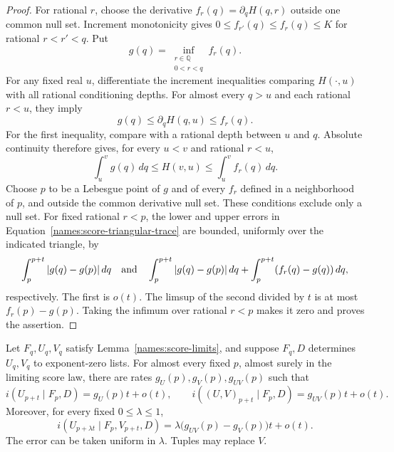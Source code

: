 \begin{proof}
For rational $r$, choose the derivative
$f_r(q)=\partial_qH(q,r)$ outside one common null set.  Increment
monotonicity gives $0\le f_{r'}(q)\le f_r(q)\le K$ for rational
$r<r'<q$.  Put
\[
 g(q)=\inf_{\substack{r\in\mathbb Q\\0<r<q}}f_r(q).
\]
For any fixed real $u$, differentiate the increment inequalities
comparing $H(\cdot,u)$ with all rational conditioning depths.  For
almost every $q>u$ and each rational $r<u$, they imply
\[
 g(q)\le\partial_qH(q,u)\le f_r(q).
\]
For the first inequality, compare with a rational depth between $u$
and $q$.  Absolute continuity therefore gives, for every $u<v$ and
rational $r<u$,
\begin{equation}
 \int_u^v g(q)\,dq\le H(v,u)\le\int_u^v f_r(q)\,dq.
 \label{names:score-trace-sandwich}
\end{equation}
Choose $p$ to be a Lebesgue point of $g$ and of every $f_r$ defined in a
neighborhood of $p$, and outside the common derivative null set.  These
conditions exclude only a null set.  For fixed rational $r<p$, the lower
and upper errors in Equation~\eqref{names:score-triangular-trace} are
bounded, uniformly over the indicated triangle, by
\[
 \int_p^{p+t}|g(q)-g(p)|\,dq
 \quad\hbox{and}\quad
 \int_p^{p+t}|g(q)-g(p)|\,dq
       +\int_p^{p+t}(f_r(q)-g(q))\,dq,
\]
respectively.  The first is $o(t)$.  The limsup of the second divided by
$t$ is at most $f_r(p)-g(p)$.  Taking the infimum over rational $r<p$
makes it zero and proves the assertion.
\end{proof}

\begin{corollary}
\label{names:score-future-prefix}
Let $F_q,U_q,V_q$ satisfy Lemma~\ref{names:score-limits}, and suppose
$F_q,D$ determines $U_q,V_q$ to exponent-zero lists.  For almost every
fixed $p$, almost surely in the limiting score law, there are rates
$g_U(p),g_V(p),g_{UV}(p)$ such that
\[
 i(U_{p+t}\mid F_p,D)=g_U(p)t+o(t),\qquad
 i((U,V)_{p+t}\mid F_p,D)=g_{UV}(p)t+o(t).
\]
Moreover, for every fixed $0\le\lambda\le1$,
\begin{equation}
 i(U_{p+\lambda t}\mid F_p,V_{p+t},D)
  =\lambda\bigl(g_{UV}(p)-g_V(p)\bigr)t+o(t).
 \label{names:score-future-prefix-formula}
\end{equation}
The error can be taken uniform in $\lambda$.  Tuples may replace $V$.
\end{corollary}

